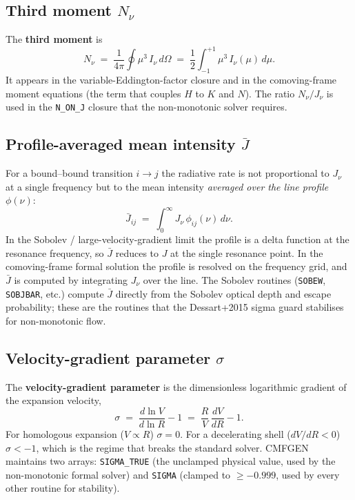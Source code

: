 \documentclass[11pt]{article}
\begin{document}
\subsection{Third moment \texorpdfstring{$N_\nu$}{N\_nu}}

The \textbf{third moment} is
\begin{equation}
  N_\nu \;=\; \frac{1}{4\pi}\oint \mu^{3}\, I_\nu\,d\Omega
  \;=\; \frac{1}{2}\int_{-1}^{+1} \mu^{3}\, I_\nu(\mu)\,d\mu .
\end{equation}
It appears in the variable-Eddington-factor closure and in the
comoving-frame moment equations (the term that couples $H$ to $K$ and
$N$).  The ratio $N_\nu/J_\nu$ is used in the \texttt{N\_ON\_J} closure
that the non-monotonic solver requires.

\subsection{Profile-averaged mean intensity \texorpdfstring{$\bar J$}{Jbar}}

For a bound--bound transition $i \to j$ the radiative rate is not
proportional to $J_\nu$ at a single frequency but to the mean intensity
\emph{averaged over the line profile} $\phi(\nu)$:
\begin{equation}
  \bar J_{ij} \;=\; \int_0^\infty J_\nu\,\phi_{ij}(\nu)\,d\nu .
\end{equation}
In the Sobolev / large-velocity-gradient limit the profile is a delta
function at the resonance frequency, so $\bar J$ reduces to $J$ at the
single resonance point.  In the comoving-frame formal solution the
profile is resolved on the frequency grid, and $\bar J$ is computed by
integrating $J_\nu$ over the line.  The Sobolev routines
(\texttt{SOBEW}, \texttt{SOBJBAR}, etc.) compute $\bar J$ directly from
the Sobolev optical depth and escape probability; these are the
routines that the Dessart+2015 sigma guard stabilises for
non-monotonic flow.

\subsection{Velocity-gradient parameter \texorpdfstring{$\sigma$}{sigma}}

The \textbf{velocity-gradient parameter} is the dimensionless logarithmic
gradient of the expansion velocity,
\begin{equation}
  \sigma \;=\; \frac{d\ln V}{d\ln R} - 1
  \;=\; \frac{R}{V}\,\frac{dV}{dR} - 1 .
\end{equation}
For homologous expansion ($V \propto R$) $\sigma = 0$.  For a
decelerating shell ($dV/dR < 0$) $\sigma < -1$, which is the regime that
breaks the standard solver.  CMFGEN maintains two arrays:
\texttt{SIGMA\_TRUE} (the unclamped physical value, used by the
non-monotonic formal solver) and \texttt{SIGMA} (clamped to
$\ge -0.999$, used by every other routine for stability).
\end{document}

